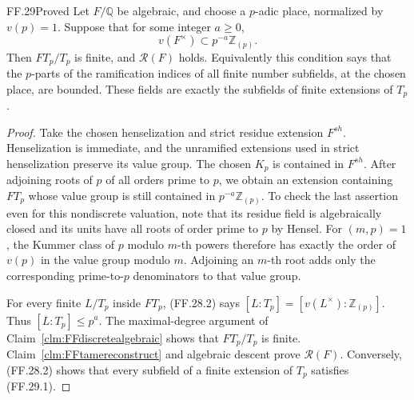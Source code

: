 \begin{claim}{FF.29}{Proved}\label{clm:FFboundedwild}
Let \(F/\mathbb Q\) be algebraic, and choose a
\(p\)-adic place, normalized by \(v(p)=1\).
Suppose that for some integer \(a\geq0\),
\[
                 v(F^\times)\subset
                       p^{-a}\mathbb Z_{(p)}.          \tag{FF.29.1}
\]
Then \(FT_p/T_p\) is finite, and \(\mathcal R(F)\)
holds. Equivalently this condition says that the
\(p\)-parts of the ramification indices of all
finite number subfields, at the chosen place,
are bounded. These fields are exactly the subfields
of finite extensions of \(T_p\).
\end{claim}
\begin{proof}
Take the chosen henselization and strict residue
extension \(F^{sh}\). Henselization is immediate,
and the unramified extensions used in strict
henselization preserve its value group. The
chosen \(K_p\) is contained in \(F^{sh}\).
After adjoining roots of \(p\) of all orders
prime to \(p\), we obtain an extension containing
\(FT_p\) whose value group is still contained
in \(p^{-a}\mathbb Z_{(p)}\). To check the last
assertion even for this nondiscrete valuation,
note that its residue field is algebraically
closed and its units have all roots of order
prime to \(p\) by Hensel. For \((m,p)=1\),
the Kummer class of \(p\) modulo \(m\)-th powers
therefore has exactly the order of \(v(p)\)
in the value group modulo \(m\). Adjoining an
\(m\)-th root adds only the corresponding
prime-to-\(p\) denominators to that value group.

For every finite \(L/T_p\) inside \(FT_p\),
(FF.28.2) says
\([L:T_p]=[v(L^\times):\mathbb Z_{(p)}]\).
Thus \([L:T_p]\leq p^a\). The maximal-degree
argument of Claim~\ref{clm:FFdiscretealgebraic}
shows that \(FT_p/T_p\) is finite.
Claim~\ref{clm:FFtamereconstruct} and algebraic
descent prove \(\mathcal R(F)\). Conversely,
(FF.28.2) shows that every subfield of a finite
extension of \(T_p\) satisfies (FF.29.1).
\end{proof}

